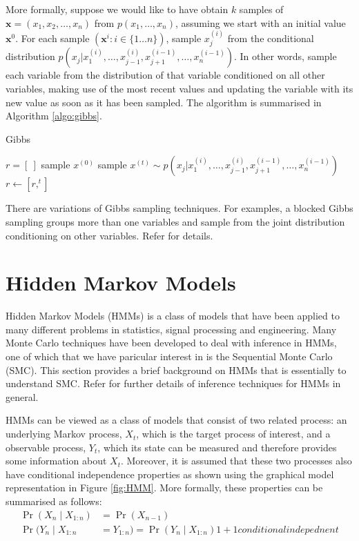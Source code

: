 More formally, suppose we would like to have obtain $k$ samples of $\mathbf{x}=(x_1,x_2,\ldots, x_n)$ from $p(x_1, \ldots, x_n)$, assuming we start with an initial value $\mathbf{x}^{0}$. For each sample $(\mathbf{x}^{i}: i \in \{1 \dots n\})$, sample $x_j^{(i)}$ from the conditional distribution $p(x_j|x_1^{(i)},\dots,x_{j-1}^{(i)},x_{j+1}^{(i-1)},\dots,x_n^{(i-1)})$. In other words, sample each variable from the distribution of that variable conditioned on all other variables, making use of the most recent values and updating the variable with its new value as soon as it has been sampled. The algorithm is summarised in Algorithm \ref{algo:gibbs}.

\begin{algorithm}
\caption{Gibbs}\label{algo:gibbs}
\begin{algorithmic}[1]
\State $r = [\ ]$
\State sample $x^{(0)}$
\Repeat
  \State sample $x^{(t)} \sim p(x_j|x_1^{(i)},\dots,x_{j-1}^{(i)},x_{j+1}^{(i-1)},\dots,x_n^{(i-1)})$
  \State $r \gets [r,^{t}]$
\EndFunction
\end{algorithmic}
\end{algorithm}

There are variations of Gibbs sampling techniques. For examples, a blocked Gibbs sampling groups more than one variables and sample from the joint distribution conditioning on other variables. Refer \cite{RCP05} for details. 

\section{Hidden Markov Models}
Hidden Markov Models (HMMs) is a class of models that have been applied to many different problems in statistics, signal processing and engineering. Many Monte Carlo techniques have been developed to deal with inference in HMMs, one of which that we have paricular interest in is the Sequential Monte Carlo (SMC). This section provides a brief background on HMMs that is essentially to understand SMC. Refer \cite{CO05} for further details of inference techniques for HMMs in general.

HMMs can be viewed as a class of models that consist of two related process: an underlying Markov process, $X_t$, which is the target process of interest, and a observable process, $Y_t$, which its state can be measured and therefore provides some information about $X_t$. Moreover, it is assumed that these two processes also have conditional independence properties as shown using the graphical model representation in Figure \ref{fig:HMM}. More formally, these properties can be summarised as follows:
\begin{align}
   \Pr(X_n \mid X_{1:n}) &= \Pr(X_{n-1})   \nonumber \\
   \Pr(Y_n \mid X_{1:n}  &= Y_{1:n}) = \Pr(Y_n \mid X_{1:n}) 
	1 + 1 conditional indepednent
\end{align}


